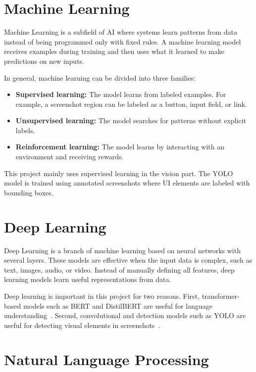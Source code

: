 \section{Machine Learning}
\label{sec:machine_learning_review}

Machine Learning is a subfield of AI where systems learn patterns from data instead of being programmed only with fixed rules. A machine learning model receives examples during training and then uses what it learned to make predictions on new inputs.

In general, machine learning can be divided into three families:

\begin{itemize}
	\item \textbf{Supervised learning:} The model learns from labeled examples. For example, a screenshot region can be labeled as a button, input field, or link.
	\item \textbf{Unsupervised learning:} The model searches for patterns without explicit labels.
	\item \textbf{Reinforcement learning:} The model learns by interacting with an environment and receiving rewards.
\end{itemize}

This project mainly uses supervised learning in the vision part. The YOLO model is trained using annotated screenshots where UI elements are labeled with bounding boxes.

\section{Deep Learning}
\label{sec:deep_learning_review}

Deep Learning is a branch of machine learning based on neural networks with several layers. These models are effective when the input data is complex, such as text, images, audio, or video. Instead of manually defining all features, deep learning models learn useful representations from data.

Deep learning is important in this project for two reasons. First, transformer-based models such as BERT and DistilBERT are useful for language understanding~\cite{bert_paper,distilbert_paper}. Second, convolutional and detection models such as YOLO are useful for detecting visual elements in screenshots~\cite{yolo_original,ultralytics_yolov8_docs}.

\section{Natural Language Processing}
\label{sec:nlp_review}

